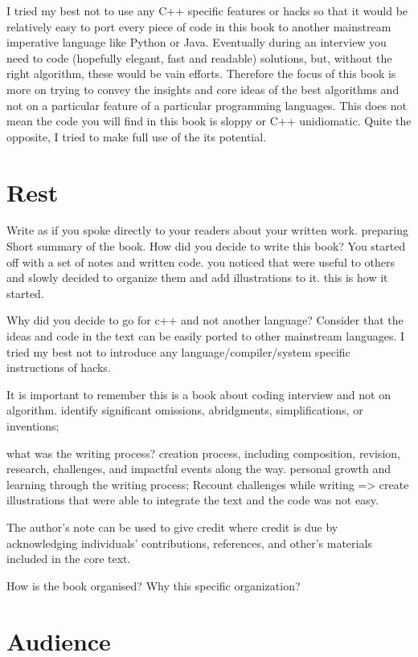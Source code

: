 I tried my best not to use any C++ specific features or hacks so that it would be relatively easy to port every piece of code in this book to another mainstream imperative language like Python or Java. 
Eventually during an interview you need to code (hopefully elegant, fast and readable) solutions, but, without the right algorithm, these would be vain efforts. Therefore the focus of this book is more on trying to convey the insights and core ideas of the best algorithms and not on a particular feature of a particular programming languages.
This does not mean the code you will find in this book is sloppy or C++ unidiomatic. Quite the opposite, I tried to make full use of the its potential.


\section*{Rest}
Write as if you spoke directly to your readers about your written work.
preparing 
Short summary of the book. 
How did you decide to write this book? You started off with a set of notes and written code. you noticed that were useful to others and slowly decided to organize them and add illustrations to it. this is how it started. 

Why did you decide to go for c++ and not another language? Consider that the ideas and code in the text can be easily ported to other mainstream languages. I tried my best not to introduce any language/compiler/system specific instructions of hacks.

It is important to remember this is a book about coding interview and not on algorithm. 
identify significant omissions, abridgments, simplifications, or inventions; 


what was the writing process?
creation process, including composition, revision, research, challenges, and impactful events along the way. personal growth and learning through the writing process; 
Recount challenges while writing => create illustrations that were able to integrate the text and the code was not easy. 


The author’s note can be used to give credit where credit is due by acknowledging individuals’ contributions, references, and other’s materials included in the core text.

How is the book organised? Why this specific organization?


\section*{Audience}



